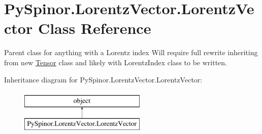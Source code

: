 \hypertarget{class_py_spinor_1_1_lorentz_vector_1_1_lorentz_vector}{}\section{Py\+Spinor.\+Lorentz\+Vector.\+Lorentz\+Vector Class Reference}
\label{class_py_spinor_1_1_lorentz_vector_1_1_lorentz_vector}


Parent class for anything with a Lorentz index Will require full rewrite inheriting from new \hyperlink{namespace_py_spinor_1_1_tensor}{Tensor} class and likely with Lorentz\+Index class to be written.  


Inheritance diagram for Py\+Spinor.\+Lorentz\+Vector.\+Lorentz\+Vector\+:\begin{figure}[H]
\begin{center}
\leavevmode
\includegraphics[height=2.000000cm]{class_py_spinor_1_1_lorentz_vector_1_1_lorentz_vector}
\end{center}
\end{figure}
